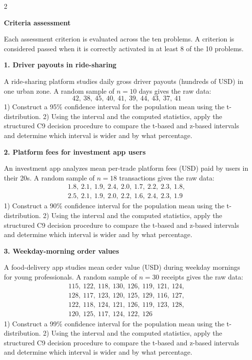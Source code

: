 \documentclass[12pt]{article}
\newcommand{\SubsectionBox}[1]{%
\noindent\colorbox{gray!30}{%
\parbox{\dimexpr\linewidth-2\fboxsep\relax}{\textbf{#1}}%
}\par\vspace{0.35cm}%
}
\begin{document}
	\begin{multicols}{2}
		\SubsectionBox{Criteria assessment}\vspace{-0.25cm}
		Each assessment criterion is evaluated across the ten problems. A criterion is considered passed when it is correctly activated in at least 8 of the 10 problems.
		
		\vspace{0.25cm}
		\SubsectionBox{1. Driver payouts in ride-sharing}\vspace{-0.25cm}
		A ride-sharing platform studies daily gross driver payouts (hundreds of USD) in one urban zone.
		A random sample of $n=10$ days gives the raw data:
		\[
		42,\ 38,\ 45,\ 40,\ 41,\ 39,\ 44,\ 43,\ 37,\ 41
		\]
		1) Construct a 95\% confidence interval for the population mean using the t-distribution.
		2) Using the interval and the computed statistics, apply the structured C9 decision procedure to compare the t-based and z-based intervals and determine which interval is wider and by what percentage.
		
		\vspace{0.25cm}
		\SubsectionBox{2. Platform fees for investment app users}\vspace{-0.25cm}
		An investment app analyzes mean per-trade platform fees (USD) paid by users in their 20s.
		A random sample of $n=18$ transactions gives the raw data:
		\[
		\begin{aligned}
			1.8,\ 2.1,\ 1.9,\ 2.4,\ 2.0,\ 1.7,\ 2.2,\ 2.3,\ 1.8,\\
			2.5,\ 2.1,\ 1.9,\ 2.0,\ 2.2,\ 1.6,\ 2.4,\ 2.3,\ 1.9
		\end{aligned}
		\]
		1) Construct a 90\% confidence interval for the population mean using the t-distribution.
		2) Using the interval and the computed statistics, apply the structured C9 decision procedure to compare the t-based and z-based intervals and determine which interval is wider and by what percentage.
		
		\vspace{0.25cm}
		\SubsectionBox{3. Weekday-morning order values}\vspace{-0.25cm}
		A food-delivery app studies mean order value (USD) during weekday mornings for young professionals.
		A random sample of $n=30$ receipts gives the raw data:
		\[
		\begin{aligned}
			115,\ 122,\ 118,\ 130,\ 126,\ 119,\ 121,\ 124,\\
			128,\ 117,\ 123,\ 120,\ 125,\ 129,\ 116,\ 127,\\
			122,\ 118,\ 124,\ 121,\ 126,\ 119,\ 123,\ 128,\\
			120,\ 125,\ 117,\ 124,\ 122,\ 126
		\end{aligned}
		\]
		1) Construct a 99\% confidence interval for the population mean using the t-distribution.
		2) Using the interval and the computed statistics, apply the structured C9 decision procedure to compare the t-based and z-based intervals and determine which interval is wider and by what percentage.
		

\end{multicols}
\end{document}
